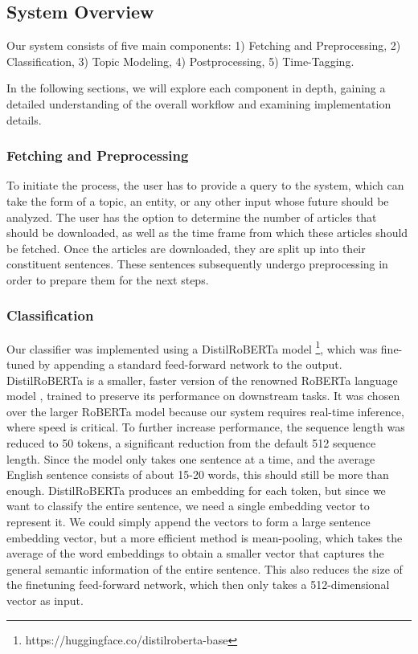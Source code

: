 \documentclass[10pt,twocolumn]{article}
\begin{document}
\subsection{System Overview}
Our system consists of five main components: 1) Fetching and Preprocessing, 2) Classification, 3) Topic Modeling, 4) Postprocessing, 5) Time-Tagging.

In the following sections, we will explore each component in depth, gaining a detailed understanding of the overall workflow and examining implementation details.

\subsubsection{Fetching and Preprocessing}
To initiate the process, the user has to provide a query to the system, which can take the form of a topic, an entity, or any other input whose future should be analyzed. The user has the option to determine the number of articles that should be downloaded, as well as the time frame from which these articles should be fetched. Once the articles are downloaded, they are split up into their constituent sentences. These sentences subsequently undergo preprocessing in order to prepare them for the next steps.

\subsubsection{Classification}
Our classifier was implemented using a DistilRoBERTa model \footnote{https://huggingface.co/distilroberta-base}, which was fine-tuned by appending a standard feed-forward network to the output. DistilRoBERTa is a smaller, faster version of the renowned RoBERTa language model \cite{roberta}, trained to preserve its performance on downstream tasks. It was chosen over the larger RoBERTa model because our system requires real-time inference, where speed is critical. To further increase performance, the sequence length was reduced to 50 tokens, a significant reduction from the default 512 sequence length. Since the model only takes one sentence at a time, and the average English sentence consists of about 15-20 words, this should still be more than enough.
DistilRoBERTa produces an embedding for each token, but since we want to classify the entire sentence, we need a single embedding vector to represent it. We could simply append the vectors to form a large sentence embedding vector, but a more efficient method is mean-pooling, which takes the average of the word embeddings to obtain a smaller vector that captures the general semantic information of the entire sentence. This also reduces the size of the finetuning feed-forward network, which then only takes a 512-dimensional vector as input.
\end{document}
